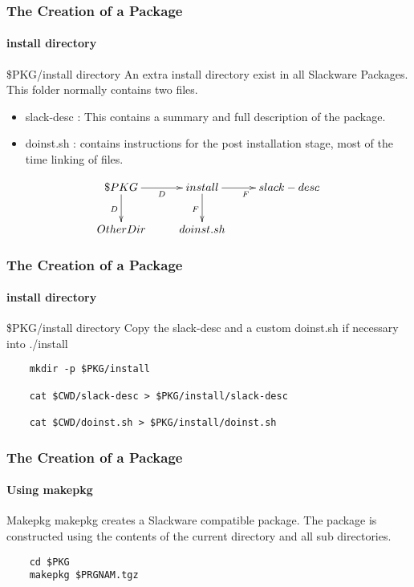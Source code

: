 \documentclass[1pt,hyperref={pdfpagelabels=true}]{beamer}
\begin{document}
\begin{frame}[fragile]
  \frametitle{The Creation of a Package}
  \framesubtitle{install directory}

  \begin{block}{\$PKG/install directory}
    An extra install directory exist in all Slackware Packages.
    This folder normally contains two files.

    \begin{itemize}[<+-| alert@+>]
    \item slack-desc : This contains a summary and full description of the
      package.
    \item doinst.sh : contains instructions for the post installation stage,
      most of the time linking of files.
    \end{itemize}

  \end{block}
  
  \pause
  
  \begin{equation*}
    \xymatrix@C=2pc@R=2pc{
      \$PKG\/\ar[r]_D\ar[d]_D & install\ar[r]_F\ar[d]_F & slack-desc\\
      OtherDir  & doinst.sh  }
  \end{equation*}
  
\end{frame}

\begin{frame}[fragile]
  \frametitle{The Creation of a Package}
  \framesubtitle{install directory}
  
  \begin{block}{\$PKG/install directory}
    Copy the slack-desc and a custom doinst.sh if necessary into ./install
  \end{block}
  
  \pause
  
  \begin{lstlisting}
    mkdir -p $PKG/install
    
    cat $CWD/slack-desc > $PKG/install/slack-desc
    
    cat $CWD/doinst.sh > $PKG/install/doinst.sh
  \end{lstlisting}
  
\end{frame}

\begin{frame}[fragile]
  \frametitle{The Creation of a Package}
  \framesubtitle{Using makepkg}
  
  \begin{block}{Makepkg}
    makepkg creates a Slackware compatible package. The package is constructed
    using the contents of the current directory and all sub directories.
  \end{block}
  
  \pause
  
  \begin{lstlisting}
    cd $PKG
    makepkg $PRGNAM.tgz
  \end{lstlisting}
  
\end{frame}
\end{document}
